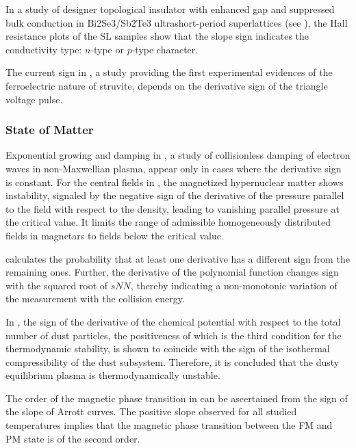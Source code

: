 \documentclass[11pt]{book}
\begin{document}
In a study of designer topological insulator with enhanced gap and suppressed bulk
conduction in Bi2Se3/Sb2Te3 ultrashort-period superlattices (see \cite{levy2020designer}), the Hall resistance plots of the SL samples show that
the slope sign indicates the conductivity type: $n$-type or $p$-type
character.

The current sign in \cite{prywer2020first}, a study providing the first experimental evidences of the ferroelectric nature of struvite, depends on the derivative
sign of the triangle voltage pulse.


\subsubsection{State of Matter}

Exponential growing and damping in \cite{soshnikov2007collisionless}, a study of collisionless damping of electron waves in non-Maxwellian plasma,
appear only in cases where the derivative sign is constant.
For the central fields in \cite{sinha2013hypernuclear}, the magnetized
hypernuclear matter shows instability, signaled by the negative sign
of the derivative of the pressure parallel to the field with respect
to the density, leading to vanishing parallel pressure at the critical
value. It limits the range of admissible homogeneously distributed
fields in magnetars to fields below the critical value.

\cite{adam2020net} calculates the probability that at least one derivative
has a different sign from the remaining ones. Further, the derivative
of the polynomial function changes sign with the squared root of $sNN$,
thereby indicating a non-monotonic variation of the measurement with
the collision energy.

In \cite{filippov2020electrostatic}, the sign of the derivative of
the chemical potential with respect to the total number of dust particles,
the positiveness of which is the third condition for the thermodynamic
stability, is shown to coincide with the sign of the isothermal compressibility
of the dust subsystem. Therefore, it is concluded that the dusty equilibrium
plasma is thermodynamically unstable.

The order of the magnetic phase transition in \cite{jeddi2020improvement}
can be ascertained from the sign of the slope of Arrott curves. The
positive slope observed for all studied temperatures implies that
the magnetic phase transition between the FM and PM state is of the
second order.
\end{document}
